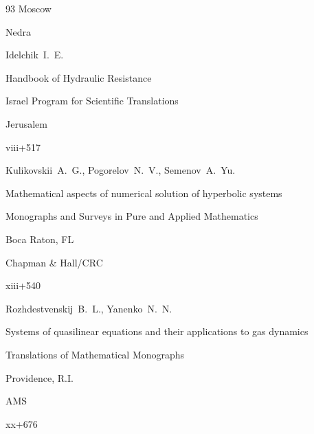 \begin{thebibliography}{93}
\publaddr Moscow

\publ Nedra










\by Idelchik~I.~E.

\book Handbook of Hydraulic Resistance

\publ Israel  Program  for  Scientific  Translations 

\publaddr Jerusalem 


\totalpages viii+517








\by Kulikovskii~A.~G., Pogorelov~N.~V., Semenov~A.~Yu.

\book Mathematical aspects of numerical solution of hyperbolic systems


\serial Monographs and Surveys in Pure and Applied Mathematics


\publaddr Boca Raton, FL

\publ Chapman \& Hall/CRC

\totalpages xiii+540 









\by Rozhdestvenskij~B.~L., Yanenko~N.~N.

\book Systems of quasilinear equations and their applications to gas dynamics


\serial Translations of Mathematical Monographs


\publaddr Providence, R.I.

\publ AMS

\totalpages xx+676 







\end{thebibliography}
